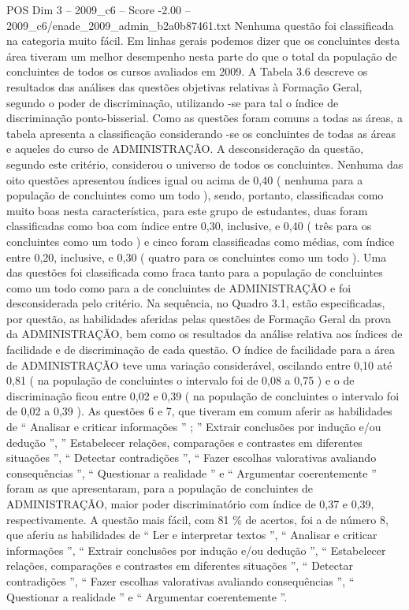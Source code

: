 \begin{textsample}{POS Dim 3 – 2009\_c6 – Score -2.00 – 2009\_c6/enade\_2009\_admin\_b2a0b87461.txt}
Nenhuma questão foi classificada na categoria muito fácil.
Em linhas gerais podemos dizer que os concluintes desta área tiveram um melhor desempenho nesta parte do que o total da população de concluintes de todos os cursos avaliados em 2009.
A Tabela 3.6 descreve os resultados das análises das questões objetivas relativas à Formação Geral, segundo o poder de discriminação, utilizando -se para tal o índice de discriminação ponto-bisserial.
Como as questões foram comuns a todas as áreas, a tabela apresenta a classificação considerando -se os concluintes de todas as áreas e aqueles do curso de ADMINISTRAÇÃO.
A desconsideração da questão, segundo este critério, considerou o universo de todos os concluintes.
Nenhuma das oito questões apresentou índices igual ou acima de 0,40 ( nenhuma para a população de concluintes como um todo ), sendo, portanto, classificadas como muito boas nesta característica, para este grupo de estudantes, duas foram classificadas como boa com índice entre 0,30, inclusive, e 0,40 ( três para os concluintes como um todo ) e cinco foram classificadas como médias, com índice entre 0,20, inclusive, e 0,30 ( quatro para os concluintes como um todo ).
Uma das questões foi classificada como fraca tanto para a população de concluintes como um todo como para a de concluintes de ADMINISTRAÇÃO e foi desconsiderada pelo critério.
Na sequência, no Quadro 3.1, estão especificadas, por questão, as habilidades aferidas pelas questões de Formação Geral da prova da ADMINISTRAÇÃO, bem como os resultados da análise relativa aos índices de facilidade e de discriminação de cada questão.
O índice de facilidade para a área de ADMINISTRAÇÃO teve uma variação considerável, oscilando entre 0,10 até 0,81 ( na população de concluintes o intervalo foi de 0,08 a 0,75 ) e o de discriminação ficou entre 0,02 e 0,39 ( na população de concluintes o intervalo foi de 0,02 a 0,39 ).
As questões 6 e 7, que tiveram em comum aferir as habilidades de “ Analisar e criticar informações ” ; ” Extrair conclusões por indução e/ou dedução ”, ” Estabelecer relações, comparações e contrastes em diferentes situações ”, “ Detectar contradições ”, “ Fazer escolhas valorativas avaliando consequências ”, “ Questionar a realidade ” e “ Argumentar coerentemente ” foram as que apresentaram, para a população de concluintes de ADMINISTRAÇÃO, maior poder discriminatório com índice de 0,37 e 0,39, respectivamente.
A questão mais fácil, com 81 \% de acertos, foi a de número 8, que aferiu as habilidades de “ Ler e interpretar textos ”, “ Analisar e criticar informações ”, “ Extrair conclusões por indução e/ou dedução ”, “ Estabelecer relações, comparações e contrastes em diferentes situações ”, “ Detectar contradições ”, “ Fazer escolhas valorativas avaliando consequências ”, “ Questionar a realidade ” e “ Argumentar coerentemente ”.

\end{textsample}
